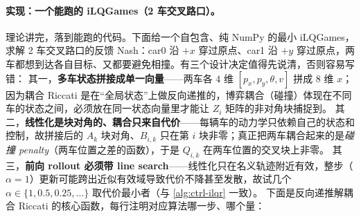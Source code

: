 \paragraph{实现：一个能跑的 iLQGames（2 车交叉路口）。}
理论讲完，落到能跑的代码。下面给一个自包含、纯 NumPy 的最小 iLQGames，求解 2 车交叉路口的反馈 Nash：car0 沿 $+x$ 穿过原点、car1 沿 $+y$ 穿过原点，两车都想到达各自目标、又都要避免相撞。有三个设计决定值得先说清，否则容易写错：
其一，\textbf{多车状态拼接成单一向量}——两车各 $4$ 维 $[p_x,p_y,\theta,v]$ 拼成 $8$ 维 $x$；因为耦合 Riccati 是在“全局状态”上做反向递推的，博弈耦合（碰撞）体现在不同车的状态之间，必须放在同一状态向量里才能让 $Z_i$ 矩阵的非对角块捕捉到。
其二，\textbf{线性化是块对角的、耦合只来自代价}——每辆车的动力学只依赖自己的状态和控制，故拼接后的 $A_k$ 块对角、$B_{i,k}$ 只在第 $i$ 块非零；真正把两车耦合起来的是\emph{碰撞 penalty}（两车位置之差的函数），于是 $Q_{i,k}$ 在两车位置的交叉块上非零。
其三，\textbf{前向 rollout 必须带 line search}——线性化只在名义轨迹附近有效，整步（$\alpha=1$）更新可能跨出近似有效域导致代价不降甚至发散，故试几个 $\alpha\in\{1,0.5,0.25,\dots\}$ 取代价最小者（与 \cref{alg:ctrl-ilqr} 一致）。
下面是反向递推解耦合 Riccati 的核心函数，每行注明对应算法哪一步、哪个量：

